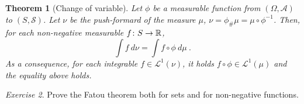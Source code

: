 \documentclass[12pt,a4paper]{amsart}
\theoremstyle{plain}
\newtheorem{theorem}{Theorem}%
\theoremstyle{definition}
\theoremstyle{remark}
\newtheorem{exercise}[theorem]{Exercise}
\begin{document}
\begin{theorem}[Change of variable] Let $\phi$ be a measurable
  function from $(\Omega,\mathcal A)$ to $(S,\mathcal S)$. Let $\nu$
  be the push-formard of the measure $\mu$, $\nu = \phi_{\#} \mu = \mu
  \circ \phi^{-1}$. Then, for each non-negative measurable $f \colon S
  \to \mathbb{R}$,
  \begin{equation*}
    \int f \ d\nu = \int f \circ \phi \ d\mu \ .
  \end{equation*}
  As a consequence, for each integrable $f \in \mathcal L^1(\nu)$, it
  holds $f \circ \phi \in \mathcal L^1(\mu)$ and the equality above
  holds.  
\end{theorem}

\begin{exercise} Prove the Fatou theorem both for sets and for non-negative
    functions.
  \end{exercise}
\end{document}
